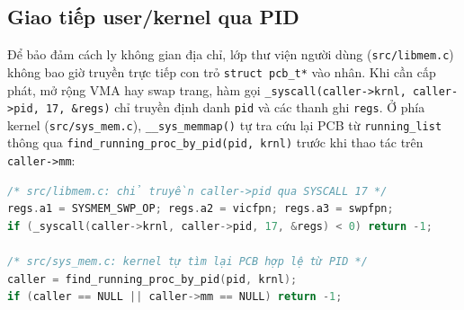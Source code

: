 \documentclass[12pt,a4paper]{article}
\begin{document}
	\subsection{Giao tiếp user/kernel qua PID}
	Để bảo đảm cách ly không gian địa chỉ, lớp thư viện người dùng (\texttt{src/libmem.c}) không bao giờ truyền trực tiếp con trỏ \texttt{struct pcb\_t*} vào nhân. Khi cần cấp phát, mở rộng VMA hay swap trang, hàm gọi \texttt{\_syscall(caller->krnl, caller->pid, 17, \&regs)} chỉ truyền định danh \texttt{pid} và các thanh ghi \texttt{regs}. Ở phía kernel (\texttt{src/sys\_mem.c}), \texttt{\_\_sys\_memmap()} tự tra cứu lại PCB từ \texttt{running\_list} thông qua \texttt{find\_running\_proc\_\allowbreak by\_pid(pid, krnl)} trước khi thao tác trên \texttt{caller->mm}:

\begin{lstlisting}[language=C, caption={Giao tiếp qua PID giữa libmem.c và sys\_mem.c}]
/* src/libmem.c: chỉ truyền caller->pid qua SYSCALL 17 */
regs.a1 = SYSMEM_SWP_OP; regs.a2 = vicfpn; regs.a3 = swpfpn;
if (_syscall(caller->krnl, caller->pid, 17, &regs) < 0) return -1;

/* src/sys_mem.c: kernel tự tìm lại PCB hợp lệ từ PID */
caller = find_running_proc_by_pid(pid, krnl);
if (caller == NULL || caller->mm == NULL) return -1;
\end{lstlisting}
\end{document}
